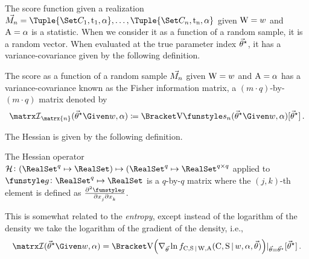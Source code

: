 \documentclass[../main.tex]{subfiles}
\begin{document}
The score function given a realization $\mfs = \Tuple{\cand_1,\ti_1,\alpha},\ldots,\Tuple{\cand_n,\ti_n,\alpha}$ given $\mathrm{W} = w$ and $\mathrm{A} = \alpha$ is a statistic.
When we consider it as a function of a random sample, it is a random vector.
When evaluated at the true parameter index ${\vec{\theta}}^{\star}$, it has a variance-covariance given by the following definition.
\begin{definition}
\label{def:info_matrix_var}
The score as a function of a random sample $\vec{M_n}$ given $\mathrm{W} = w$ and $\mathrm{A} = \alpha$ has a variance-covariance known as the Fisher information matrix, a $(m \cdot q)$-by-$(m \cdot q)$ matrix denoted by
\begin{equation}
\label{eq:info_matrix_var}
    \infomatrx_{\matrx{n}}(\tparam\sysparamvec \Given w, \alpha)
        \coloneqq \Var{\Fun{s_n}(\tparam\sysparamvec \Given w, \alpha)}[\tparam\sysparamvec]\,.
\end{equation}
\end{definition}

The Hessian is given by the following definition.
\begin{definition}
The Hessian operator $\hessian \colon (\RealSet^q \mapsto \RealSet) \mapsto (\RealSet^q \mapsto \RealSet^{q \times q}$ applied to $\Fun{g} \colon \RealSet^q \mapsto \RealSet$ is a $q$-by-$q$ matrix where the $(j,k)$-th element is defined as $\md{\Fun{g}}{2}{x_j}{}{x_k}{}$.
\end{definition}


This is somewhat related to the \emph{entropy}, except instead of the logarithm of the density we take the logarithm of the gradient of the density, i.e.,
\begin{equation}
\infomatrx(\tparam\sysparamvec \Given w, \alpha)
= \Var{\left(\nabla_{\sysparamvec} \ln \pdf_{\rvcand,\sv \given \RV{W}, \RV{A}}(\rvcand,\sv \given w,\alpha,\sysparamvec)\right) \rvert_{\sysparamvec=\tparam\sysparamvec}}[\tparam\sysparamvec]\,.
\end{equation}
\end{document}
